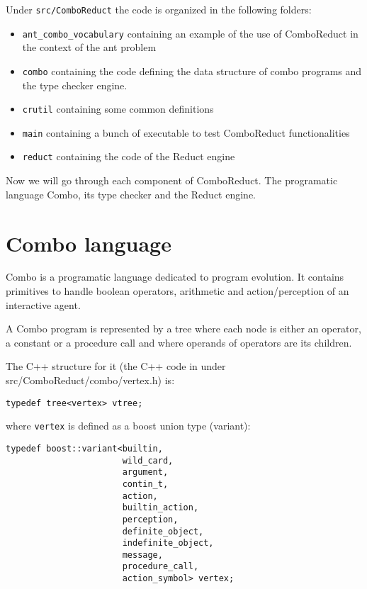 \documentclass{article}
\begin{document}
  Under \verb|src/ComboReduct| the code is organized in the following
  folders:
  \begin{itemize}
  \item \verb|ant_combo_vocabulary| containing an example of the use of
    ComboReduct in the context of the ant problem
  \item \verb|combo| containing the code defining the data structure
    of combo programs and the type checker engine.
  \item \verb|crutil| containing some common definitions
  \item \verb|main| containing a bunch of executable to test ComboReduct
    functionalities
  \item \verb|reduct| containing the code of the Reduct engine
  \end{itemize}

  Now we will go through each component of ComboReduct. The programatic language Combo, its type checker and the Reduct engine.
    
  \section{Combo language}
  
  Combo is a programatic language dedicated to program evolution.
  It contains primitives to handle boolean operators, arithmetic and
  action/perception of an interactive agent.
  
  A Combo program is represented by a tree where each node is either an
  operator, a constant or a procedure call and where operands of operators are
  its children.

  The C++ structure for it (the C++ code in under src/ComboReduct/combo/vertex.h)
  is:

  \begin{verbatim}
typedef tree<vertex> vtree;
  \end{verbatim}
  
  where \verb|vertex| is defined as a boost union type (variant):
  
  \begin{verbatim}
typedef boost::variant<builtin,
                       wild_card,
                       argument,
                       contin_t,
                       action,
                       builtin_action,
                       perception,
                       definite_object,
                       indefinite_object,
                       message,
                       procedure_call,
                       action_symbol> vertex;
  \end{verbatim}
\end{document}
